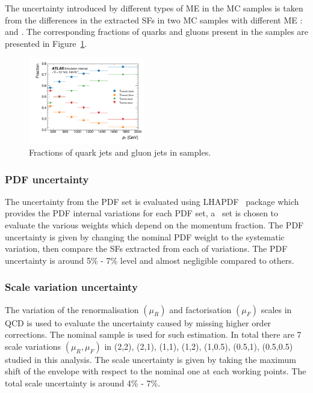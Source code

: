 The  uncertainty introduced by different types of ME in the MC samples is taken from the differences in the extracted SFs in two MC samples with different ME : \powheg and \pythia. The corresponding fractions of quarks and gluons present in the \powheg samples are presented in Figure~\ref{fig:QG-pow-Frac}. 


\begin{figure}[htb]
	\centering
	\label{fig:QG-pow-Fmc}\includegraphics[width=0.45\textwidth]{fig/powhegpythia/plots/ADE/Fractions/none_event_weight/Fraction.pdf}
	\caption[]{
		Fractions of quark jets and gluon jets in \powheg samples. %
		\label{fig:QG-pow-Frac}
	}
\end{figure}

\FloatBarrier
    \subsubsection{PDF uncertainty}
  The uncertainty from the PDF set is evaluated using \textsc{LHAPDF}~\cite{LHAPDF} package which provides the PDF internal variations for each PDF set, a \nnpdftwo~set is chosen to evaluate the various weights which depend on the momentum fraction. The PDF uncertainty is given by changing the nominal PDF weight to the systematic variation, then compare the SFs extracted from each of variations. The PDF uncertainty is around 5\% - 7\% level and almost negligible compared to others.

  
    \subsubsection{Scale variation uncertainty}
  The variation of the renormalisation $(\mu_R)$ and factorisation $(\mu_F)$ scales in QCD is used to evaluate the uncertainty caused by missing higher order corrections. The nominal \pythia sample is used for such estimation. In total there are 7 scale variations
  $(\mu_R, \mu_F)$ in (2,2), (2,1), (1,1), (1,2), (1,0.5), (0.5,1), (0.5,0.5) studied in this analysis. The scale uncertainty is given by taking the maximum shift of the envelope with respect to the nominal one at each working points. The total scale uncertainty is around 4\% - 7\%. 

